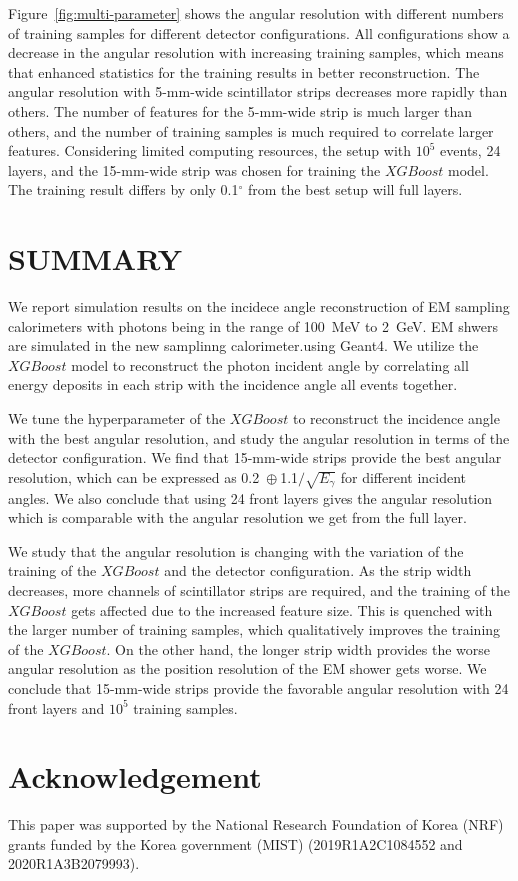 \documentclass[preprint,12pt,times,a4paper]{elsarticle}
\newcommand{\XGB}{XGBoost}
\begin{document}
Figure~\ref{fig:multi-parameter} shows the angular resolution with different numbers of training samples for different detector configurations. All configurations show a decrease in the angular resolution with increasing training samples, which means that enhanced statistics for the training results in better reconstruction. The angular resolution with 5-mm-wide scintillator strips decreases more rapidly than others. The number of features for the 5-mm-wide strip is much larger than others, and the number of training samples is much required to correlate larger features. Considering limited computing resources, the setup with $10^{5}$ events, 24 layers, and the 15-mm-wide strip was chosen for training the $\XGB$ model. The training result differs by only 0.1$^{\circ}$ from the best setup will full layers.
 
\section{SUMMARY}
\label{sec:sum}

We report simulation results on the incidece angle reconstruction of EM sampling calorimeters with photons being in the range of 100~MeV to 2~GeV. EM shwers are simulated in the new samplinng calorimeter.using Geant4. We utilize the $\XGB$ model to reconstruct the photon incident angle by correlating all energy deposits in each strip with the incidence angle all events together.

We tune the hyperparameter of the $\XGB$ to reconstruct the incidence angle with the best angular resolution, and study the angular resolution in terms of the detector configuration. We find that 15-mm-wide strips provide the best angular resolution, which can be expressed as 0.2~$\oplus~$1.1$/\sqrt{E_\gamma}$ for different incident angles. We also conclude that using 24 front layers gives the angular resolution which is comparable with the angular resolution we get from the full layer.

We study that the angular resolution is changing with the variation of the training of the $\XGB$ and the detector configuration. As the strip width decreases, more channels of scintillator strips are required, and the training of the $\XGB$ gets affected due to the increased feature size. This is quenched with the larger number of training samples, which qualitatively improves the training of the $\XGB$. On the other hand, the longer strip width provides the worse angular resolution as the position resolution of the EM shower gets worse. We conclude that 15-mm-wide strips provide the favorable angular resolution with 24 front layers and $10^{5}$ training samples.

\label{sec:con}


\section*{Acknowledgement}
This paper was supported by the National Research Foundation of Korea (NRF) grants funded by the Korea government (MIST) (2019R1A2C1084552 and 2020R1A3B2079993).


\end{document}
